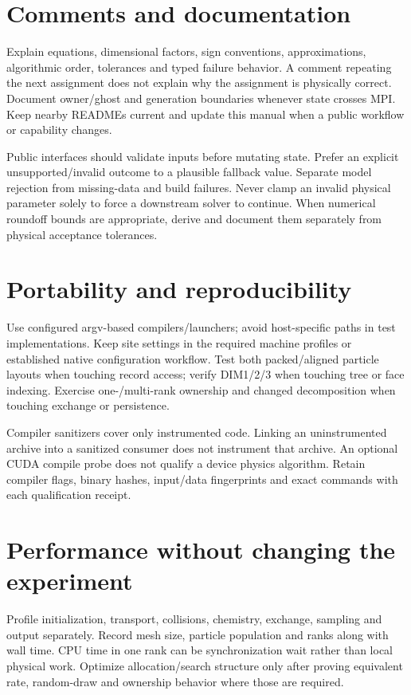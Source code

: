\section{Comments and documentation}
Explain equations, dimensional factors, sign conventions, approximations,
algorithmic order, tolerances and typed failure behavior. A comment repeating
the next assignment does not explain why the assignment is physically correct.
Document owner/ghost and generation boundaries whenever state crosses MPI.
Keep nearby READMEs current and update this manual when a public workflow or
capability changes.

Public interfaces should validate inputs before mutating state. Prefer an
explicit unsupported/invalid outcome to a plausible fallback value.
Separate model rejection from missing-data and build failures. Never clamp
an invalid physical parameter solely to force a downstream solver to continue.
When numerical roundoff bounds are appropriate, derive and document them
separately from physical acceptance tolerances.

\section{Portability and reproducibility}
Use configured argv-based compilers/launchers; avoid host-specific paths in
test implementations. Keep site settings in the required machine profiles
or established native configuration workflow. Test both packed/aligned
particle layouts when touching record access; verify DIM1/2/3 when touching
tree or face indexing. Exercise one-/multi-rank ownership and changed
decomposition when touching exchange or persistence.

Compiler sanitizers cover only instrumented code. Linking an uninstrumented
archive into a sanitized consumer does not instrument that archive.
An optional CUDA compile probe does not qualify a device physics algorithm.
Retain compiler flags, binary hashes, input/data fingerprints and exact
commands with each qualification receipt.

\section{Performance without changing the experiment}
Profile initialization, transport, collisions, chemistry, exchange, sampling
and output separately. Record mesh size, particle population and ranks along
with wall time. CPU time in one rank can be synchronization wait rather than
local physical work. Optimize allocation/search structure only after proving
equivalent rate, random-draw and ownership behavior where those are required.

